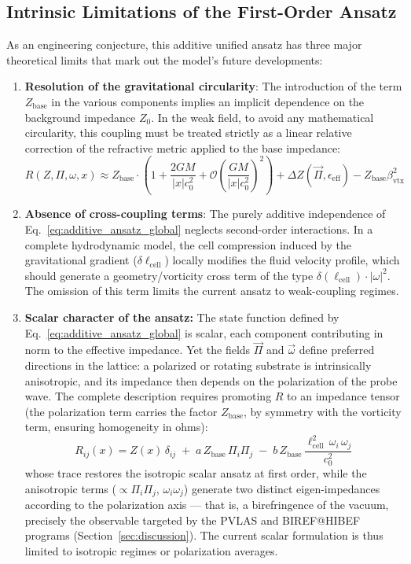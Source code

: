 \documentclass[11pt,a4paper]{article}
\theoremstyle{plain}
\theoremstyle{remark}
\begin{document}
\subsection{Intrinsic Limitations of the First-Order Ansatz}
As an engineering conjecture, this additive unified ansatz has three major theoretical limits that mark out the model's future developments:
\begin{enumerate}
    \item \textbf{Resolution of the gravitational circularity}: The introduction of the term $Z_{\text{base}}$ in the various components implies an implicit dependence on the background impedance $Z_{0}$. In the weak field, to avoid any mathematical circularity, this coupling must be treated strictly as a linear relative correction of the refractive metric applied to the base impedance:
    \begin{equation}
    R(Z, \Pi, \omega, x) \approx Z_{\text{base}} \cdot \left(1 + \frac{2GM}{|x|c_{0}^{2}} + \mathcal{O}\left(\frac{GM}{|x|c_{0}^{2}}\right)^{2}\right) + \Delta Z(\vec{\Pi}, \epsilon_{\text{eff}}) - Z_{\text{base}} \beta_{\text{vtx}}^{2}
    \end{equation}
    \item \textbf{Absence of cross-coupling terms}: The purely additive independence of Eq.~\eqref{eq:additive_ansatz_global} neglects second-order interactions. In a complete hydrodynamic model, the cell compression induced by the gravitational gradient ($\delta \ell_{\text{cell}}$) locally modifies the fluid velocity profile, which should generate a geometry/vorticity cross term of the type $\delta(\ell_{\text{cell}}) \cdot |\omega|^{2}$. The omission of this term limits the current ansatz to weak-coupling regimes.

    \item \textbf{Scalar character of the ansatz:} The state function defined by Eq.~\eqref{eq:additive_ansatz_global} is scalar, each component contributing in norm to the effective impedance. Yet the fields $\vec{\Pi}$ and $\vec{\omega}$ define preferred directions in the lattice: a polarized or rotating substrate is intrinsically anisotropic, and its impedance then depends on the polarization of the probe wave. The complete description requires promoting $R$ to an impedance tensor (the polarization term carries the factor $Z_{\text{base}}$, by symmetry with the vorticity term, ensuring homogeneity in ohms):
\begin{equation}\label{eq:impedance_tensor}
R_{ij}(x) = Z(x)\,\delta_{ij}
  \;+\; a\,Z_{\text{base}}\,\Pi_i \Pi_j
  \;-\; b\,Z_{\text{base}}\,
        \frac{\ell_{\text{cell}}^{2}\,\omega_i\,\omega_j}{c_{0}^{2}}
\end{equation}
whose trace restores the isotropic scalar ansatz at first order, while the anisotropic terms ($\propto \Pi_i\Pi_j$, $\omega_i\omega_j$) generate two distinct eigen-impedances according to the polarization axis --- that is, a birefringence of the vacuum, precisely the observable targeted by the PVLAS and BIREF@HIBEF programs (Section~\ref{sec:discussion}). The current scalar formulation is thus limited to isotropic regimes or polarization averages.
\end{enumerate}
\end{document}
